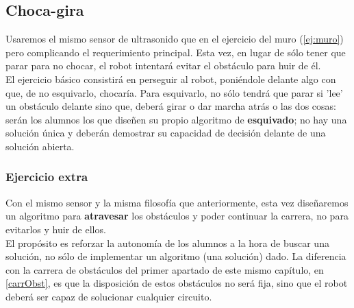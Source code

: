\subsection{Choca-gira}\label{ej:chocaGira}
Usaremos el mismo sensor de ultrasonido que en el ejercicio del muro (\ref{ej:muro}) pero complicando el requerimiento principal. Esta vez, en lugar de sólo tener que parar para no chocar, el robot intentará evitar el obstáculo para huir de él. \\
El ejercicio básico consistirá en perseguir al robot, poniéndole delante algo con que, de no esquivarlo, chocaría. Para esquivarlo, no sólo tendrá que parar si 'lee' un obstáculo delante sino que, deberá girar o dar marcha atrás o las dos cosas: serán los alumnos los que diseñen su propio algoritmo de \textbf{esquivado}; no hay una solución única y deberán demostrar su capacidad de decisión delante de una solución abierta.
\subsubsection{Ejercicio extra}
Con el mismo sensor y la misma filosofía que anteriormente, esta vez diseñaremos un algoritmo para \textbf{atravesar} los obstáculos y poder continuar la carrera, no para evitarlos y huir de ellos. \\
El propósito es reforzar la autonomía de los alumnos a la hora de buscar una solución, no sólo de implementar un algoritmo (una solución) dado. La diferencia con la carrera de obstáculos del primer apartado de este mismo capítulo, en \ref{carrObst}, es que la disposición de estos obstáculos no será fija, sino que el robot deberá ser capaz de solucionar cualquier circuito.
